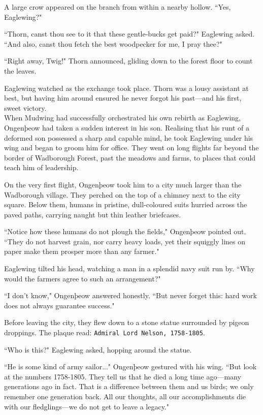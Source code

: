 A large crow appeared on the branch from within a nearby hollow.
``Yes, Eaglewing?"

``Thorn, canst thou see to it that these gentle-bucks get paid?"
Eaglewing asked.
``And also, canst thou fetch the best woodpecker for me, I pray thee?"

``Right away, Twig!" Thorn announced, gliding down to the forest floor to count the leaves.

Eaglewing watched as the exchange took place.
Thorn was a lousy assistant at best, but having him around ensured he never forgot his past---and his first, sweet victory.\\

When Mudwing had successfully orchestrated his own rebirth as Eaglewing, Ongenþeow had taken a sudden interest in his son.
Realising that his runt of a deformed son possessed a sharp and capable mind, he took Eaglewing under his wing and began to groom him for office.
They went on long flights far beyond the border of Wadborough Forest, past the meadows and farms, to places that could teach him of leadership.

On the very first flight, Ongenþeow took him to a city much larger than the Wadborough village.
They perched on the top of a chimney next to the city square.
Below them, humans in pristine, dull-coloured suits hurried across the paved paths, carrying naught but thin leather briefcases.

``Notice how these humans do not plough the fields,"
Ongenþeow pointed out. %
``They do not harvest grain, nor carry heavy loads, yet their squiggly lines on paper make them prosper more than any farmer."

Eaglewing tilted his head, watching a man in a splendid navy suit run by.
``Why would the farmers agree to such an arrangement?"

``I don't know," Ongenþeow answered honestly.
``But never forget this: hard work does not always guarantee success."

Before leaving the city, they flew down to a stone statue surrounded by pigeon droppings.
The plaque read: \texttt{Admiral Lord Nelson, 1758-1805}.

``Who is this?" Eaglewing asked, hopping around the statue.

``He is some kind of army sailor..." Ongenþeow gestured with his wing.
``But look at the numbers 1758-1805. They tell us that he died a long time ago---many generations ago in fact.
That is a difference between them and us birds; we only remember one generation back.
All our thoughts, all our accomplishments die with our fledglings---we do not get to leave a legacy." \\

